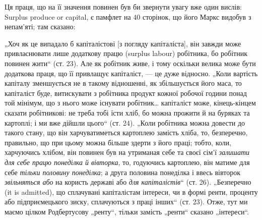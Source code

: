 \parcont{}  %
Ця праця, що на її значення повинен був би звернути увагу вже один
вислів: Surplus produce or capital, є памфлет на 40 сторінок, що його
Маркс видобув з непам’яті; там сказано:

„Хоч як це випадало б капіталістові [з погляду капіталіста], він
завжди може привласнювати лише додаткову працю (surplus labour) робітника,
бо робітник повинен жити“ (ст. 23). Але як робітник живе,
і тому оскільки велика може бути додаткова праця, що її привлащує
капіталіст, — це дуже відносно. „Коли вартість капіталу зменшується
не в такому відношенні, як збільшується його маса, то капіталіст буде,
витискувати з робітника продукт кожної робочої години понад той мінімум,
що з нього може існувати робітник\dots{} капіталіст може, кінець-кінцем
сказати робітникові: не треба тобі їсти хліб, бо можна прожити й на
буряках та картоплі; і ми вже дійшли цього“ (ст. 24). „Коли робітника
можна довести до такого стану, що він харчуватиметься картоплею замість
хліба, то, безперечно, правильно, що при цьому можна більше здерти з
його праці; тобто, коли, харчуючись хлібом, він повинен був на утриманая
себе та своєї сім’ї  \emph{залишати для себе працю понеділка й вівторка},
то, годуючись картоплею, він матиме для себе  \emph{тільки половину понеділка};
а друга половина понеділка і ввесь вівторок  \emph{звільняться або} на користь
державі або  \emph{для капіталістів}“ (ст. 26). „Безперечно (it is admitted),
що сплачувані капіталістам інтереси, чи в формі ренти, проценту або
підприємецького зиску, сплачуються з праці інших“ (ст. 23). Отже, тут
ми маємо цілком Родбертусову „ренту“, тільки замість „ренти“ сказано
„інтереси“.

